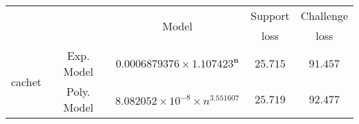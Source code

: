 \begin{tabular}{ccccc} 
\hline 
 &  & \multirow{2}{*}{Model} & Support & Challenge\tabularnewline 
 &  &  & loss  & loss\tabularnewline 
\hline 
\hline 
\multirow{2}{*}{cachet} & Exp. Model & $\mathbf{0.0006879376\times 1.107423^{n}}$ & $\mathbf{25.715}$ & $\mathbf{91.457}$ \tabularnewline 
 & Poly. Model & $8.082052\times10^{-8}\times n^{3.551607}$ & $25.719$ & $92.477$ \tabularnewline 
\hline 
\end{tabular} 

